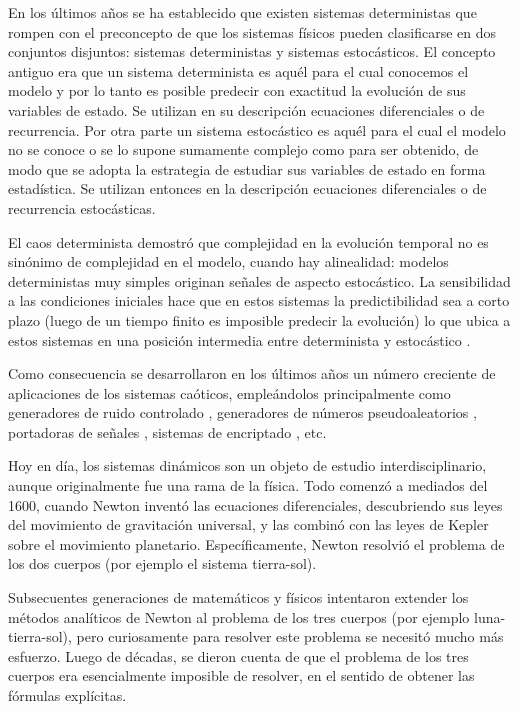En los últimos años se ha establecido que existen sistemas deterministas que rompen con el preconcepto de que los sistemas físicos pueden clasificarse en dos conjuntos disjuntos: sistemas deterministas y sistemas estocásticos.
El concepto antiguo era que un sistema determinista es aquél para el cual conocemos el modelo y por lo tanto es posible predecir con exactitud la evolución de sus variables de estado.
Se utilizan en su descripción ecuaciones diferenciales o de recurrencia.
Por otra parte un sistema estocástico es aquél para el cual el modelo no se conoce o se lo supone sumamente complejo como para ser obtenido, de modo que se adopta la estrategia de estudiar sus variables de estado en forma estadística.
Se utilizan entonces en la descripción ecuaciones diferenciales o de recurrencia estocásticas.

El caos determinista demostró que complejidad en la evolución temporal no es sinónimo de complejidad en el modelo, cuando hay alinealidad: modelos deterministas muy simples originan señales de aspecto estocástico.
La sensibilidad a las condiciones iniciales hace que en estos sistemas la predictibilidad sea a corto plazo (luego de un tiempo finito es imposible predecir la evolución) lo que ubica a estos sistemas en una posición intermedia entre determinista y estocástico \cite{Liao2013a}.

Como consecuencia se desarrollaron en los últimos años un número creciente de aplicaciones de los sistemas caóticos, empleándolos principalmente como generadores de ruido controlado \cite{DeMicco2007C}, generadores de números pseudoaleatorios \cite{DeMicco2007A}, portadoras de señales \cite{DeMicco2007B}, sistemas de encriptado \cite{Machado2004, Smaoui2009}, etc.

Hoy en día, los sistemas dinámicos son un objeto de estudio interdisciplinario, aunque originalmente fue una rama de la física.
Todo comenzó a mediados del 1600, cuando Newton inventó las ecuaciones diferenciales, descubriendo sus leyes del movimiento de gravitación universal, y las combinó con las leyes de Kepler sobre el movimiento planetario.
Específicamente, Newton resolvió el problema de los dos cuerpos (por ejemplo el sistema tierra-sol).

Subsecuentes generaciones de matemáticos y físicos intentaron extender los métodos analíticos de Newton al problema de los tres cuerpos (por ejemplo luna-tierra-sol), pero curiosamente para resolver este problema se necesitó mucho más esfuerzo.
Luego de décadas, se dieron cuenta de que el problema de los tres cuerpos era esencialmente imposible de resolver, en el sentido de obtener las fórmulas explícitas.

